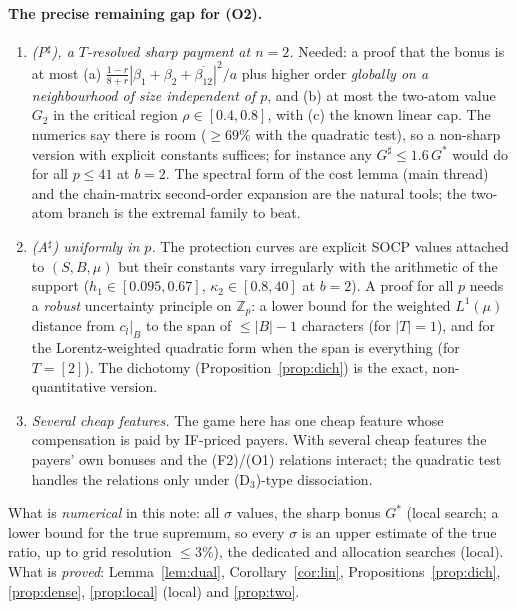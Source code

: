 \documentclass[11pt]{article}
\theoremstyle{definition}
\begin{document}
\paragraph{The precise remaining gap for (O2).}
\begin{enumerate}
\item \emph{(P$^\sharp$), a $T$-resolved sharp payment at $n=2$.}  Needed: a proof that the bonus is at most (a) $\frac{1-r}{8+r}|\beta_1+\beta_2+\overline{\beta_{12}}|^2/a$
plus higher order \emph{globally on a neighbourhood of size independent of $p$}, and (b) at most the two-atom value $G_2$ in the critical region
$\rho\in[0.4,0.8]$, with (c) the known linear cap.  The numerics say there is room ($\ge69\%$ with the quadratic test), so a non-sharp version with
explicit constants suffices; for instance any $G^\sharp\le1.6\,G^*$ would do for all $p\le41$ at $b=2$.  The spectral form of the cost lemma (main thread)
and the chain-matrix second-order expansion are the natural tools; the two-atom branch is the extremal family to beat.
\item \emph{(A$^\sharp$) uniformly in $p$.}  The protection curves are explicit SOCP values attached to $(S,B,\mu)$ but their constants vary irregularly with the
arithmetic of the support ($h_1\in[0.095,0.67]$, $\kappa_2\in[0.8,40]$ at $b=2$).  A proof for all $p$ needs a \emph{robust} uncertainty principle on $\mathbb Z_p$:
a lower bound for the weighted $L^1(\mu)$ distance from $c_l|_B$ to the span of $\le|B|-1$ characters (for $|T|=1$), and for the Lorentz-weighted quadratic form
when the span is everything (for $T=[2]$).  The dichotomy (Proposition~\ref{prop:dich}) is the exact, non-quantitative version.
\item \emph{Several cheap features.}  The game here has one cheap feature whose compensation is paid by IF-priced payers.  With several cheap features the
payers' own bonuses and the (F2)/(O1) relations interact; the quadratic test handles the relations only under (D$_3$)-type dissociation.
\end{enumerate}
What is \emph{numerical} in this note: all $\sigma$ values, the sharp bonus $G^*$ (local search; a lower bound for the true supremum, so every
$\sigma$ is an upper estimate of the true ratio, up to grid resolution $\le3\%$), the dedicated and allocation searches (local).  What is \emph{proved}:
Lemma~\ref{lem:dual}, Corollary~\ref{cor:lin}, Propositions~\ref{prop:dich}, \ref{prop:dense}, \ref{prop:local} (local) and \ref{prop:two}.
\end{document}
